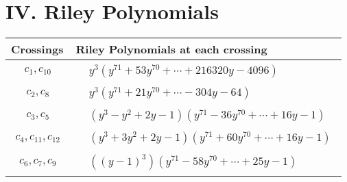 \documentclass[1p]{elsarticle_modified}
\theoremstyle{definition}
\begin{document}
\centering \section*{ IV. Riley Polynomials}
\begin{tabular}{m{50pt}|m{274pt}}
Crossings & \hspace{64pt}Riley Polynomials at each crossing \\
\hline $$\begin{aligned}c_{1},c_{10}\end{aligned}$$&$\begin{aligned}
&y^3(y^{71}+53 y^{70}+\cdots+216320 y-4096)
\end{aligned}$\\
\hline $$\begin{aligned}c_{2},c_{8}\end{aligned}$$&$\begin{aligned}
&y^3(y^{71}+21 y^{70}+\cdots-304 y-64)
\end{aligned}$\\
\hline $$\begin{aligned}c_{3},c_{5}\end{aligned}$$&$\begin{aligned}
&(y^3- y^2+2 y-1)(y^{71}-36 y^{70}+\cdots+16 y-1)
\end{aligned}$\\
\hline $$\begin{aligned}c_{4},c_{11},c_{12}\end{aligned}$$&$\begin{aligned}
&(y^3+3 y^2+2 y-1)(y^{71}+60 y^{70}+\cdots+16 y-1)
\end{aligned}$\\
\hline $$\begin{aligned}c_{6},c_{7},c_{9}\end{aligned}$$&$\begin{aligned}
&((y-1)^3)(y^{71}-58 y^{70}+\cdots+25 y-1)
\end{aligned}$\\
\hline
\end{tabular}
\vskip 2pc
\end{document}
